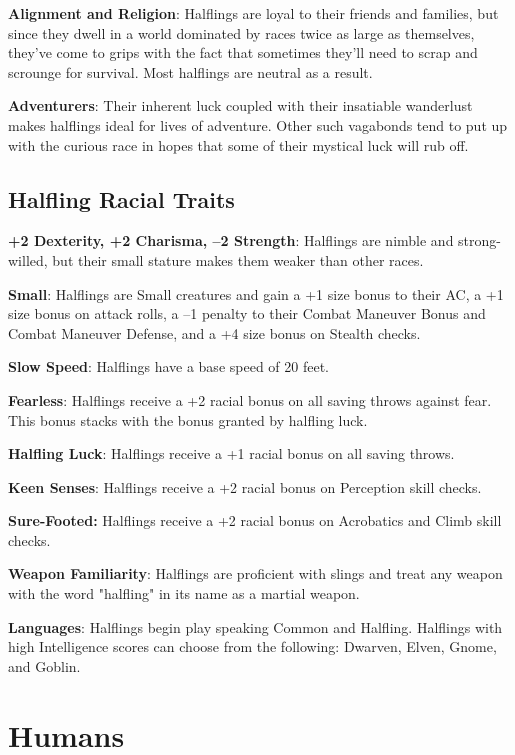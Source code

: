 \textbf{Alignment and Religion}: Halflings are loyal to their friends and families, but since they dwell in a world dominated by races twice as large as themselves, they've come to grips with the fact that sometimes they'll need to scrap and scrounge for survival. Most halflings are neutral as a result.
				
\textbf{Adventurers}: Their inherent luck coupled with their insatiable wanderlust makes halflings ideal for lives of adventure. Other such vagabonds tend to put up with the curious race in hopes that some of their mystical luck will rub off.
											
\subsection{Halfling Racial Traits}

				
\textbf{+2 Dexterity, +2 Charisma, --2 Strength}: Halflings are nimble and strong-willed, but their small stature makes them weaker than other races.
				
\textbf{Small}: Halflings are Small creatures and gain a +1 size bonus to their AC, a +1 size bonus on attack rolls, a --1 penalty to their Combat Maneuver Bonus and Combat Maneuver Defense, and a +4 size bonus on Stealth checks.
				
\textbf{Slow Speed}: Halflings have a base speed of 20 feet.
				
\textbf{Fearless}: Halflings receive a +2 racial bonus on all saving throws against fear. This bonus stacks with the bonus granted by halfling luck.
				
\textbf{Halfling Luck}: Halflings receive a +1 racial bonus on all saving throws.
				
\textbf{Keen Senses}: Halflings receive a +2 racial bonus on Perception skill checks.
				
\textbf{Sure-Footed:} Halflings receive a +2 racial bonus on Acrobatics and Climb skill checks.
				
\textbf{Weapon Familiarity}: Halflings are proficient with slings and treat any weapon with the word "halfling" in its name as a martial weapon.
				
\textbf{Languages}: Halflings begin play speaking Common and Halfling. Halflings with high Intelligence scores can choose from the following: Dwarven, Elven, Gnome, and Goblin.
							
\section{Humans}


